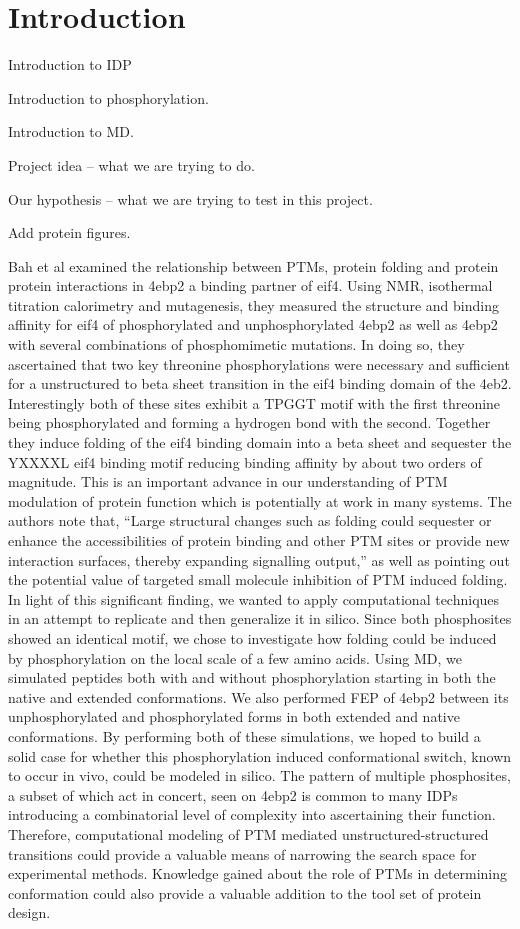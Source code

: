 \section{Introduction} %
\label{sec:introduction}

Introduction to IDP

Introduction to phosphorylation.

Introduction to MD.

Project idea -- what we are trying to do.

Our hypothesis -- what we are trying to test in this project.

Add protein figures.


Bah et al examined the relationship between PTMs, protein folding and protein protein interactions in 4ebp2 a binding partner of eif4.
Using NMR, isothermal titration calorimetry and mutagenesis, they measured the structure and binding affinity for eif4 of phosphorylated and unphosphorylated 4ebp2 as well as 4ebp2 with several combinations of phosphomimetic mutations.
In doing so, they ascertained that two key threonine phosphorylations were necessary and sufficient for a unstructured to beta sheet transition in the eif4 binding domain of the 4eb2.
Interestingly both of these sites exhibit a TPGGT motif with the first threonine being phosphorylated and forming a hydrogen bond with the second.
Together they induce folding of the eif4 binding domain into a beta sheet and sequester the YXXXXL eif4 binding motif reducing binding affinity by about two orders of magnitude.
This is an important advance in our understanding of PTM modulation of protein function which is potentially at work in many systems.
The authors note that, “Large structural changes such as folding could sequester or enhance the accessibilities of protein binding and other PTM sites or provide new interaction surfaces, thereby expanding signalling output,” as well as pointing out the potential value of targeted small molecule inhibition of PTM induced folding.  In light of this significant finding, we wanted to apply computational techniques in an attempt to replicate and then generalize it in silico. Since both phosphosites showed an identical motif, we chose to investigate how folding could be induced by phosphorylation on the local scale of a few amino acids.   Using MD, we simulated peptides both with and without phosphorylation starting in both the native and extended conformations.  We also performed FEP of 4ebp2 between its unphosphorylated and phosphorylated forms in both extended and native conformations.  By performing both of these simulations, we hoped to build a solid case for whether this phosphorylation induced conformational switch, known to occur in vivo, could be modeled in silico.  The pattern of multiple phosphosites, a subset of which act in concert, seen on 4ebp2 is common to many IDPs introducing a combinatorial level of complexity into ascertaining their function. Therefore, computational modeling of PTM mediated unstructured-structured transitions could provide a valuable means of narrowing the search space for experimental methods.  Knowledge gained about the role of PTMs in determining conformation could also provide a valuable addition to the tool set of protein design.


